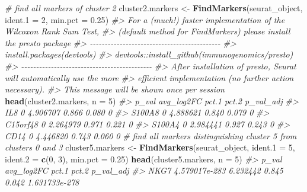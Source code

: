 \documentclass[
]{book}
\newenvironment{Shaded}{\begin{snugshade}}{\end{snugshade}}
\newcommand{\AttributeTok}[1]{\textcolor[rgb]{0.13,0.29,0.53}{#1}}
\newcommand{\CommentTok}[1]{\textcolor[rgb]{0.56,0.35,0.01}{\textit{#1}}}
\newcommand{\DecValTok}[1]{\textcolor[rgb]{0.00,0.00,0.81}{#1}}
\newcommand{\FloatTok}[1]{\textcolor[rgb]{0.00,0.00,0.81}{#1}}
\newcommand{\FunctionTok}[1]{\textcolor[rgb]{0.13,0.29,0.53}{\textbf{#1}}}
\newcommand{\NormalTok}[1]{#1}
\newcommand{\OtherTok}[1]{\textcolor[rgb]{0.56,0.35,0.01}{#1}}
\begin{document}
\begin{Shaded}
\begin{Highlighting}[]
\CommentTok{\# find all markers of cluster 2}
\NormalTok{cluster2.markers }\OtherTok{\textless{}{-}} \FunctionTok{FindMarkers}\NormalTok{(seurat\_object, }\AttributeTok{ident.1 =} \DecValTok{2}\NormalTok{, }\AttributeTok{min.pct =} \FloatTok{0.25}\NormalTok{)}
\CommentTok{\#\textgreater{} For a (much!) faster implementation of the Wilcoxon Rank Sum Test,}
\CommentTok{\#\textgreater{} (default method for FindMarkers) please install the presto package}
\CommentTok{\#\textgreater{} {-}{-}{-}{-}{-}{-}{-}{-}{-}{-}{-}{-}{-}{-}{-}{-}{-}{-}{-}{-}{-}{-}{-}{-}{-}{-}{-}{-}{-}{-}{-}{-}{-}{-}{-}{-}{-}{-}{-}{-}{-}{-}{-}{-}}
\CommentTok{\#\textgreater{} install.packages(\textquotesingle{}devtools\textquotesingle{})}
\CommentTok{\#\textgreater{} devtools::install\_github(\textquotesingle{}immunogenomics/presto\textquotesingle{})}
\CommentTok{\#\textgreater{} {-}{-}{-}{-}{-}{-}{-}{-}{-}{-}{-}{-}{-}{-}{-}{-}{-}{-}{-}{-}{-}{-}{-}{-}{-}{-}{-}{-}{-}{-}{-}{-}{-}{-}{-}{-}{-}{-}{-}{-}{-}{-}{-}{-}}
\CommentTok{\#\textgreater{} After installation of presto, Seurat will automatically use the more }
\CommentTok{\#\textgreater{} efficient implementation (no further action necessary).}
\CommentTok{\#\textgreater{} This message will be shown once per session}
\FunctionTok{head}\NormalTok{(cluster2.markers, }\AttributeTok{n =} \DecValTok{5}\NormalTok{)}
\CommentTok{\#\textgreater{}          p\_val avg\_log2FC pct.1 pct.2 p\_val\_adj}
\CommentTok{\#\textgreater{} IL8          0   4.906707 0.866 0.080         0}
\CommentTok{\#\textgreater{} S100A8       0   4.888621 0.840 0.079         0}
\CommentTok{\#\textgreater{} C15orf48     0   2.264979 0.971 0.221         0}
\CommentTok{\#\textgreater{} S100A4       0   2.984441 0.927 0.243         0}
\CommentTok{\#\textgreater{} CD14         0   4.446820 0.743 0.060         0}
\CommentTok{\# find all markers distinguishing cluster 5 from clusters 0 and 3}
\NormalTok{cluster5.markers }\OtherTok{\textless{}{-}} \FunctionTok{FindMarkers}\NormalTok{(seurat\_object, }\AttributeTok{ident.1 =} \DecValTok{5}\NormalTok{, }\AttributeTok{ident.2 =} \FunctionTok{c}\NormalTok{(}\DecValTok{0}\NormalTok{, }\DecValTok{3}\NormalTok{), }\AttributeTok{min.pct =} \FloatTok{0.25}\NormalTok{)}
\FunctionTok{head}\NormalTok{(cluster5.markers, }\AttributeTok{n =} \DecValTok{5}\NormalTok{)}
\CommentTok{\#\textgreater{}              p\_val avg\_log2FC pct.1 pct.2     p\_val\_adj}
\CommentTok{\#\textgreater{} NKG7 4.579017e{-}283   6.232442 0.845 0.042 1.631733e{-}278}

\end{Highlighting}
\end{Shaded}
\end{document}
